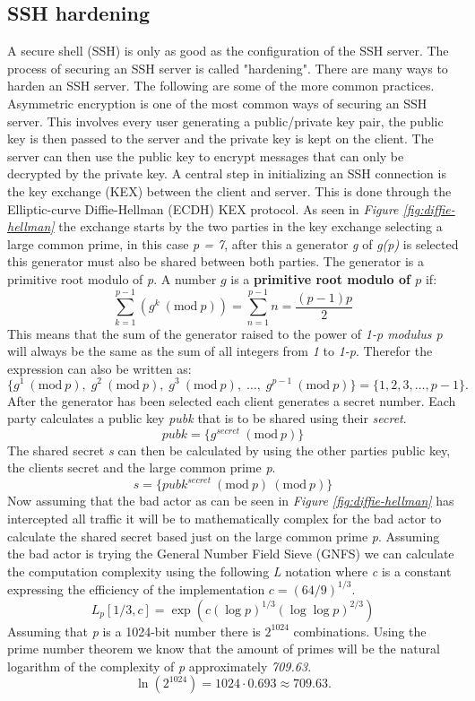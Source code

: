 \documentclass[12pt]{article}
\newcommand{\Mod}[1]{\ (\mathrm{mod}\ #1)}
\begin{document}
\subsection{SSH hardening}
A secure shell (SSH) is only as good as the configuration of the SSH server.
The process of securing an SSH server is called "hardening".
There are many ways to harden an SSH server. The following are some of the 
more common practices. Asymmetric encryption is one of the most common ways of 
securing an SSH server.
This involves every user generating a public/private key pair, the
public key is then passed to the server and the private key is kept on the client.
The server can then use the public key to encrypt messages that can only be decrypted
by the private key. A central step in initializing an SSH connection is the 
key exchange (KEX) between the client and server. This is done through 
the Elliptic-curve Diffie-Hellman (ECDH) KEX protocol.
As seen in \textit{Figure \ref{fig:diffie-hellman}} the exchange starts by 
the two parties in the key exchange selecting a large common prime, in this case
\textit{p = 7}, after this a generator \textit{g} of \textit{g(p)} is selected
this generator must also be shared between both parties. The generator 
is a primitive root modulo of \textit{p}.
A number \( g \) is a \textbf{primitive root modulo of \( p \)} if:
\[
\sum_{k=1}^{p-1} \left( g^k\Mod{p} \right) = \sum_{n=1}^{p-1} n = \frac{(p-1)p}{2}
\]
This means that the sum of the generator raised to the power of \textit{1-p modulus p} will always be the 
same as the sum of all integers from \textit{1} to \textit{1-p}. Therefor the expression can also be written as:
\[
\{ g^1\Mod{p},\;g^2\Mod{p},\;g^3\Mod{p},\;\dots,\;g^{p-1} \Mod{p} \} = \{ 1, 2, 3, \dots, p-1 \}.
\]
After the generator has been selected each client generates a secret number.
Each party calculates a public key \textit{pubk} that is to be shared using their \textit{secret}.
\[
pubk = \{g^{secret} \Mod{p}\}
\]
The shared secret \textit{s} can then be calculated by using the other parties public key,
the clients secret and the large common prime \textit{p}.
\[
s = \{pubk^{secret} \Mod{p} \Mod{p}\}
\]
Now assuming that the bad actor as can be seen in \textit{Figure \ref{fig:diffie-hellman}} has intercepted
all traffic it will be to mathematically complex for the bad actor to calculate the shared secret 
based just on the large common prime \textit{p}. Assuming the bad actor is trying the 
General Number Field Sieve (GNFS) we can calculate the computation complexity using the following
\textit{L} notation where \textit{c} is a constant expressing the efficiency of the implementation
\(c = (64/9)^{1/3}.\)
\[
L_p\left[1/3, c\right] = \exp\left(c (\log p)^{1/3} (\log \log p)^{2/3}\right)
\]
Assuming that \textit{p} is a 1024-bit number there is 
\(2^{1024}\) combinations. Using the prime number theorem we know that the amount of primes 
will be the natural logarithm of the complexity of \textit{p} approximately \textit{709.63}.
\[
\ln(2^{1024}) = 1024 \cdot 0.693 \approx 709.63.
\]
\end{document}
